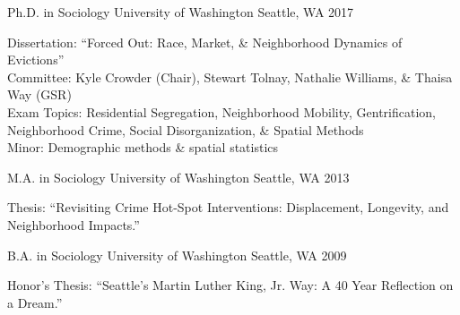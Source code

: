 

\begin{cventries}

  \cventry
    {Ph.D. in Sociology} %
    {University of Washington} %
    {Seattle, WA} %
    {2017} %
    {
      \begin{cvitems} %
        {Dissertation: “Forced Out: Race, Market, \& Neighborhood Dynamics of Evictions”}\\ %
        {Committee: Kyle Crowder (Chair), Stewart Tolnay, Nathalie Williams, \& Thaisa Way (GSR)}\\
        {Exam Topics: Residential Segregation, Neighborhood Mobility, Gentrification,
Neighborhood Crime, Social Disorganization, \& Spatial Methods}\\
        {Minor: Demographic methods \& spatial statistics}
      \end{cvitems}
    }

  \cventry
    {M.A. in Sociology} %
    {University of Washington} %
    {Seattle, WA} %
    {2013} %
    {
      \begin{cvitems} %
        {Thesis: “Revisiting Crime Hot-Spot Interventions: Displacement, Longevity, and Neighborhood Impacts.”}
      \end{cvitems}
    }

  \cventry
    {B.A. in Sociology} %
    {University of Washington} %
    {Seattle, WA} %
    {2009} %
    {
      \begin{cvitems} %
        {Honor’s Thesis: “Seattle’s Martin Luther King, Jr. Way: A 40 Year Reflection on a Dream.”}
      \end{cvitems}
    }

\end{cventries}
